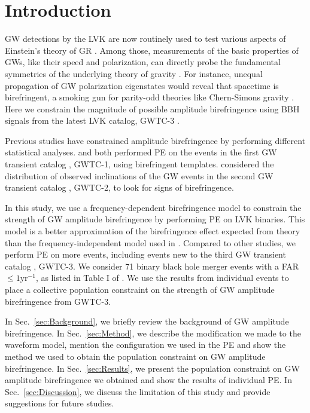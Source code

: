 \documentclass[aps,prd,twocolumn,superscriptaddress,preprintnumbers,floatfix,nofootinbib]{revtex4-2}
\begin{document}
\section{Introduction}
\label{sec:Introduction}
\Ac{GW} detections by the \ac{LVK} \citep{LIGO, Virgo, KAGRA} are now routinely used to test various aspects of Einstein's theory of \ac{GR} \citep{LIGOScientific:2016lio,LIGOScientific:2018dkp,LIGOScientific:2021sio}.
Among those, measurements of the basic properties of \acp{GW}, like their speed and polarization, can directly probe the fundamental symmetries of the underlying theory of gravity \citep{Will:2018bme}.
For instance, unequal propagation of \ac{GW} polarization eigenstates would reveal that spacetime is birefringent, a smoking gun for parity-odd theories like Chern-Simons gravity \citep{Jackiw:2003pm,Alexander:2009tp,Sopuerta:2009iy}.
Here we constrain the magnitude of possible amplitude birefringence using \ac{BBH} signals from the latest \ac{LVK} catalog, GWTC-3 \citep{GWTC-3}.

Previous studies have constrained amplitude birefringence by performing different statistical analyses.
\citet{Yamada_2020} and \citet{Wang_2021} both performed \ac{PE} on the events in the first \ac{GW} transient catalog \citep{GWTC-1}, GWTC-1, using birefringent templates.
\citet{Okounkova_2022} considered the distribution of observed inclinations of the \ac{GW} events in the second \ac{GW} transient catalog \citep{GWTC-2}, GWTC-2, to look for signs of birefringence.

In this study, we use a frequency-dependent birefringence model to constrain the strength of \ac{GW} amplitude birefringence by performing \ac{PE} on \ac{LVK} binaries.
This model is a better approximation of the birefringence effect expected from theory than the frequency-independent model used in \citet{Okounkova_2022}.
Compared to other studies, we perform \ac{PE} on more events, including events new to the third \ac{GW} transient catalog \citep{GWTC-3}, GWTC-3.
We consider 71 binary black hole merger events with a \ac{FAR} $\leq1\mathrm{yr^{-1}}$, as listed in Table I of \citet{GWTC-3_population}.
We use the results from individual events to place a collective population constraint on the strength of \ac{GW} amplitude birefringence from GWTC-3.

In Sec.~\ref{sec:Background}, we briefly review the background of \ac{GW} amplitude birefringence.
In Sec.~\ref{sec:Method}, we describe the modification we made to the waveform model, mention the configuration we used in the \ac{PE} and show the method we used to obtain the population constraint on \ac{GW} amplitude birefringence.
In Sec.~\ref{sec:Results}, we present the population constraint on \ac{GW} amplitude birefringence we obtained and show the results of individual \ac{PE}.
In Sec.~\ref{sec:Discussion}, we discuss the limitation of this study and provide suggestions for future studies.
\end{document}
